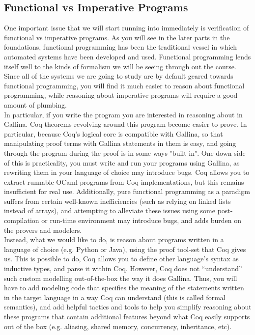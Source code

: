 \documentclass{article}
\begin{document}
\subsection{Functional vs Imperative Programs}

One important issue that we will start running into immediately is verification of functional vs imperative programs.
As you will see in the later parts in the foundations, functional programming has been the traditional vessel in which
automated systems have been developed and used. Functional programming lends itself well to the kinds of formalism we
will be seeing through out the course. Since all of the systems we are going to study are by default geared towards
functional programming, you will find it much easier to reason about functional programming, while reasoning about
imperative programs will require a good amount of plumbing. \\

In particular, if you write the program you are interested in reasoning about in Gallina. Coq theorems revolving around
this program become easier to prove. In particular, because Coq's logical core is compatible with Gallina, so that
manipulating proof terms with Gallina statements in them is easy, and going through the program during the proof
is in some ways "built-in". One down side of this is practicality, you must write and run your programs using Gallina,
as rewriting them in your language of choice may introduce bugs. Coq allows you to extract runnable OCaml programs
from Coq implementations, but this remains insufficient for real use. Additionally, pure functional programming as a paradigm
suffers from certain well-known inefficiencies (such as relying on linked lists instead of arrays), and attempting to alleviate
these issues using some post-compilation or run-time environment may introduce bugs, and adds burden on the provers and modelers. \\

Instead, what we would like to do, is reason about programs written in a language of choice (e.g. Python or Java), using the
proof tool-set that Coq gives us. This is possible to do, Coq allows you to define other language's syntax as inductive types, and parse
it within Coq. However, Coq does not ``understand'' such custom modelling out-of-the-box the way it does Gallina. Thus, you will have
to add modeling code that specifies the meaning of the statements written in the target language in a way Coq can understand (this is 
called formal semantics), and add helpful tactics and tools to help you simplify reasoning about these programs that contain additional
features beyond what Coq easily supports out of the box (e.g. aliasing, shared memory, concurrency, inheritance, etc). \\
\end{document}
